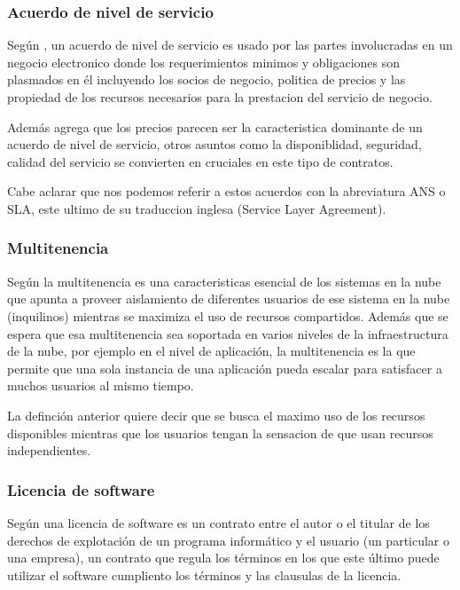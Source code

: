 \subsubsection{Acuerdo de nivel de servicio}
Seg\'un \cite{qianq}, un acuerdo de nivel de servicio es usado por las partes
involucradas en un negocio electronico donde los requerimientos minimos y obligaciones son
plasmados en \'el incluyendo los socios de negocio, politica de precios y las propiedad
de los recursos necesarios para la prestacion del servicio de negocio.

Adem\'as \cite{qianq} agrega que los precios parecen ser la caracteristica dominante
de un acuerdo de nivel de servicio, otros asuntos como la disponiblidad, seguridad,
calidad del servicio se convierten en cruciales en este tipo de contratos.

Cabe aclarar que nos podemos referir a estos acuerdos con la abreviatura ANS o SLA,
este ultimo de su traduccion inglesa (Service Layer Agreement).

\subsubsection{Multitenencia}

Seg\'un \cite{chandra} la multitenencia es una caracteristicas esencial de los
sistemas en la nube que apunta a proveer aislamiento de diferentes usuarios de
ese sistema en la nube (inquilinos) mientras se maximiza el uso de recursos compartidos.
Adem\'as \citep{chandra} que se espera que esa multitenencia sea soportada en varios niveles de la infraestructura
de la nube, por ejemplo en el nivel de aplicaci\'on, la multitenencia es la que permite
que una sola instancia de una aplicaci\'on pueda escalar para satisfacer a muchos
usuarios al mismo tiempo.

La definci\'on anterior quiere decir que se busca el maximo uso de los recursos
disponibles mientras que los usuarios tengan la sensacion de que usan recursos
independientes.
\subsubsection{Licencia de software}
Seg\'un \cite{moro} una licencia de software es un contrato entre el autor o el titular
de los derechos de explotaci\'on de un programa inform\'atico y el usuario (un particular
o una empresa), un contrato que regula los t\'erminos en los que este \'ultimo puede
utilizar el software cumpliento los t\'erminos y las clausulas de la licencia.

